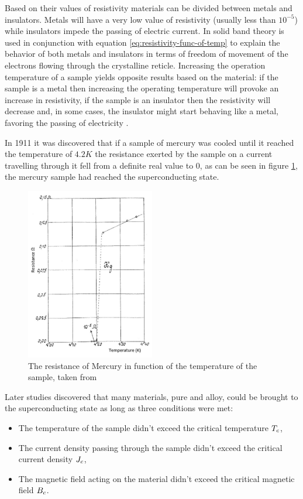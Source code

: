 Based on their values of resistivity materials can be divided between metals and insulators. Metals
will have a very low value of resistivity (usually less than $10^{-5}$) while insulators impede the
passing of electric current.
In \cite{slimani2022superconducting} solid band theory is used in conjunction with equation
\ref{eq:resistivity-func-of-temp} to explain the behavior of both metals and insulators in terms of
freedom of movement of the electrons flowing through the crystalline reticle. Increasing the
operation temperature of a sample yields opposite results based on the material: if the sample is a
metal then increasing the operating temperature will provoke an increase in resistivity, if the
sample is an insulator then the resistivity will decrease and, in some cases, the insulator might
start behaving like a metal, favoring the passing of electricity \cite{slimani2022superconducting}.

In 1911 \cite{invention-superconductivity} it was discovered that if a sample of mercury was cooled
until it reached the temperature of $4.2K$ the resistance exerted by the sample on a current travelling
through it fell from a definite real value to $0$, as can be
seen in figure \ref{img:mercury-resistance}, the mercury sample had reached the superconducting state.
\begin{figure}
	\centering
	\includegraphics[width=0.5\textwidth]{./img/mercury-resistance.png}
	\caption{The resistance of Mercury in function of the temperature of the sample, taken from
		\cite{tsukerman2020compendium}}
	\label{img:mercury-resistance}
\end{figure}

Later studies discovered that many materials, pure and alloy, could be brought to the
superconducting state as long as three conditions were met:
\begin{itemize}
	\item The temperature of the sample didn't exceed the critical temperature $T_c$,
	\item The current density passing through the sample didn't exceed the critical current
	      density $J_c$,
	\item The magnetic field acting on the material didn't exceed the critical magnetic field $B_c$.
\end{itemize}

